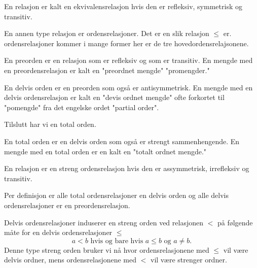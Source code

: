 \begin{definisjon}\label{Def:EkvivRel}
    En relasjon er kalt en ekvivalensrelasjon hvis den er
    refleksiv, symmetrisk og transitiv.
\end{definisjon}

En annen type relasjon er ordensrelasjoner. Det er en slik
relasjon $\leq$ er. ordensrelasjoner kommer i mange former
her er de tre hovedordensrelajsonene.

\begin{definisjon}\label{Def:Preord}
    En preorden er en relasjon som er refleksiv og som er
    transitiv. En mengde med en preordensrelasjon er kalt
    en "preordnet mengde" "promengder."
\end{definisjon}

\begin{definisjon}\label{Def:Partord}
    En delvis orden er en preorden som også er
    antisymmetrisk. En mengde med en delvis ordensrelasjon
    er kalt en "devis ordnet mengde" ofte forkortet til
    "pomengde" fra det engelske ordet "partial order".
\end{definisjon}

Tilslutt har vi en total orden.

\begin{definisjon}\label{Def:Totord}
    En total orden er en delvis orden som også er strengt
    sammenhengende. En mengde med en total orden er en
    kalt en "totalt ordnet mengde."
\end{definisjon}

\begin{definisjon}\label{Def:Strengord}
    En relasjon er en streng ordensrelasjon hvis den er
    assymmetrisk, irrefleksiv og transitiv.
\end{definisjon}

\begin{bemerk}\label{Rem:OrdRelHiriarki}
Per definisjon er alle total ordensrelasjoner en delvis
  orden og alle delvis ordensrelasjoner er en
  preordensrelasjon.
\end{bemerk}

\begin{bemerk}\label{Rem:Strengord}
    Delvis ordensrelasjoner induserer en streng orden ved
    relasjonen $<$ på følgende måte for en delvis
    ordensrelasjoner $\leq$
    \[a<b \text{ hvis og bare hvis } a\leq b \text{ og
    } a\neq b.\]
    Denne type streng orden bruker vi nå hvor
    ordensrelasjonene med $\leq$ vil være delvis ordner,
    mens ordensrelasjonene med $<$ vil være strenger
    ordner.
\end{bemerk}

